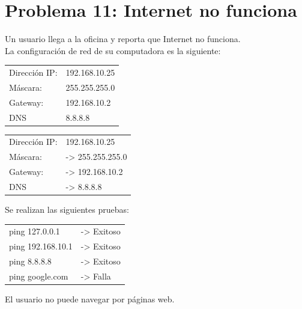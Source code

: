 \section{Problema 11: Internet no funciona}

\begin{tcolorbox}[enunciado]
Un usuario llega a la oficina y reporta que Internet no funciona. \\
La configuración de red de su computadora es la siguiente:

\vspace{10pt}
\begin{center}
\begin{minipage}{5.5cm}
\begin{tabular}{ll}
Dirección IP:   & 192.168.10.25 \\
Máscara: & 255.255.255.0 \\
Gateway:     & 192.168.10.2 \\
DNS  & 8.8.8.8
\end{tabular}
\end{minipage}
\end{center}
\vspace{10pt}

\begin{tabular}{ll}
Dirección IP:   & 192.168.10.25 \\
Máscara: & -> 255.255.255.0 \\
Gateway:     & -> 192.168.10.2 \\
DNS  & -> 8.8.8.8
\end{tabular}

Se realizan las siguientes pruebas:
\begin{terminal}
\begin{tabular}{ll}
ping 127.0.0.1    & -> Exitoso \\
ping 192.168.10.1 & -> Exitoso \\
ping 8.8.8.8      & -> Exitoso \\
ping google.com   & -> Falla
\end{tabular}
\end{terminal}
El usuario no puede navegar por páginas web.


\end{tcolorbox}
